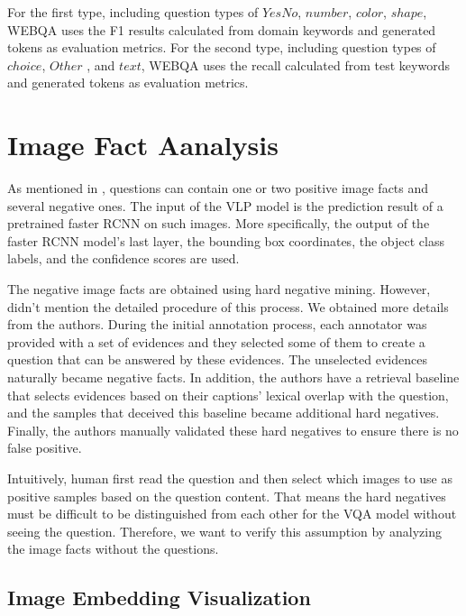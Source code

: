 \documentclass[nohyperref]{article}
\theoremstyle{plain}
\theoremstyle{definition}
\theoremstyle{remark}
\begin{document}
    For the first type, including question types of $\mathit{YesNo}$, $\mathit{number}$, $\mathit{color}$, $\mathit{shape}$, WEBQA uses the F1 results calculated from domain keywords and generated tokens as evaluation metrics. For the second type, including question types of $\mathit{choice}$, $\mathit{Other}$ , and $\mathit{text}$, WEBQA uses the recall calculated from test keywords and generated tokens as evaluation metrics.


    \section{Image Fact Aanalysis}

    As mentioned in \cite{webqa}, questions can contain one or two positive image facts and several negative ones.
    The input of the VLP model is the prediction result of a pretrained faster RCNN on such images.
    More specifically, the output of the faster RCNN model's last layer, the bounding
    box coordinates, the object class labels, and the confidence scores are used.

    The negative image facts are obtained using hard negative mining.
    However, \cite{webqa} didn't mention the detailed procedure of this process.
    We obtained more details from the authors.
    During the initial annotation process, each annotator was provided with a set of evidences and
    they selected some of them to create a question that can be answered by these evidences.
    The unselected evidences naturally became negative facts.
    In addition, the authors have a retrieval baseline that selects evidences based on their captions' lexical overlap
    with the question, and the samples that deceived this baseline became additional hard negatives.
    Finally, the authors manually validated these hard negatives to ensure there is no false positive.

    Intuitively, human first read the question and then select which images to use as positive samples based on the
    question content.
    That means the hard negatives must be difficult to be distinguished from each other for the VQA model
    without seeing the question.
    Therefore, we want to verify this assumption by analyzing the image facts without the questions.

    \subsection{Image Embedding Visualization}
\end{document}
